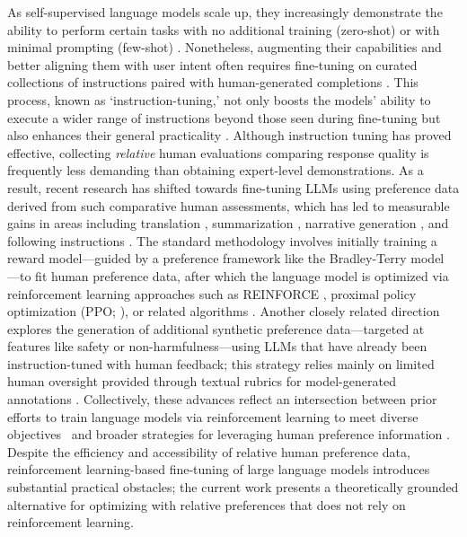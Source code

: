 As self-supervised language models scale up, they increasingly demonstrate the ability to perform certain tasks with no additional training (zero-shot) \citep{radford2019language} or with minimal prompting (few-shot) \citep{gpt3,megatron,chowdhery2022palm}. Nonetheless, augmenting their capabilities and better aligning them with user intent often requires fine-tuning on curated collections of instructions paired with human-generated completions \citep{mishra-etal-2022-cross,sanh2022multitask,chung2022scaling,thoppilan2022lamda}. This process, known as `instruction-tuning,' not only boosts the models' ability to execute a wider range of instructions beyond those seen during fine-tuning but also enhances their general practicality \citep{chung2022scaling}. Although instruction tuning has proved effective, collecting \textit{relative} human evaluations comparing response quality is frequently less demanding than obtaining expert-level demonstrations. As a result, recent research has shifted towards fine-tuning LLMs using preference data derived from such comparative human assessments, which has led to measurable gains in areas including translation \citep{kreutzer-etal-2018-reliability}, summarization \citep{stiennon2022learning,ziegler2020finetuning}, narrative generation \citep{ziegler2020finetuning}, and following instructions \citep{ouyang2022training,ramamurthy2023is}. The standard methodology involves initially training a reward model—guided by a preference framework like the Bradley-Terry model \citep{bradley1952rankanalysis}—to fit human preference data, after which the language model is optimized via reinforcement learning approaches such as REINFORCE \citep{williams1992reinforce}, proximal policy optimization (PPO; \cite{schulman2017proximal}), or related algorithms \citep{ramamurthy2023is}. Another closely related direction explores the generation of additional synthetic preference data—targeted at features like safety or non-harmfulness—using LLMs that have already been instruction-tuned with human feedback; this strategy relies mainly on limited human oversight provided through textual rubrics for model-generated annotations \citep{bai2022constitutional}. Collectively, these advances reflect an intersection between prior efforts to train language models via reinforcement learning to meet diverse objectives~\citep{Ranzato2015SequenceLT,paulus2018a,wu2018learning} and broader strategies for leveraging human preference information \citep{christiano2017deep,kupcsik2018learning}. Despite the efficiency and accessibility of relative human preference data, reinforcement learning-based fine-tuning of large language models introduces substantial practical obstacles; the current work presents a theoretically grounded alternative for optimizing with relative preferences that does not rely on reinforcement learning.

